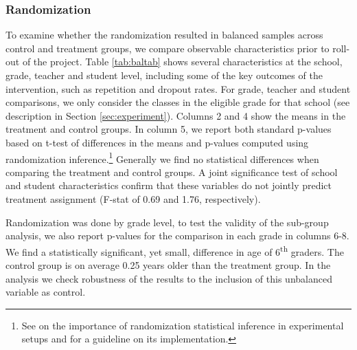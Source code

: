 \documentclass[11pt,a4paper]{article}
\begin{document}
	\subsubsection*{Randomization}
	To examine whether the randomization resulted in balanced samples across control and treatment groups, we compare observable characteristics prior to roll-out of the project. Table \ref{tab:baltab} shows several characteristics at the school, grade, teacher and student level, including some of the key outcomes of the intervention, such as repetition and dropout rates. For grade, teacher and student comparisons, we only consider the classes in the eligible grade for that school (see description in Section \ref{sec:experiment}). Columns 2 and 4 show the means in the treatment and control groups. In column 5, we report both standard p-values based on t-test of differences in the means and p-values computed using randomization inference.\footnote{See \cite{young2019channelling} on the importance of randomization statistical inference in experimental setups and \cite{hess2017randomization} for a guideline on its implementation.} Generally we find no statistical differences when comparing the treatment and control groups. A joint significance test of school and student characteristics confirm that these variables do not jointly predict treatment assignment (F-stat of 0.69 and 1.76, respectively).
	
	Randomization was done by grade level, to test the validity of the sub-group analysis, we also report p-values for the comparison in each grade in columns 6-8. We find a statistically significant, yet small, difference in age of 6\textsuperscript{th} graders. The control group is on average 0.25 years older than the treatment group. In the analysis we check robustness of the results to the inclusion of this unbalanced variable as control.
	
\end{document}
